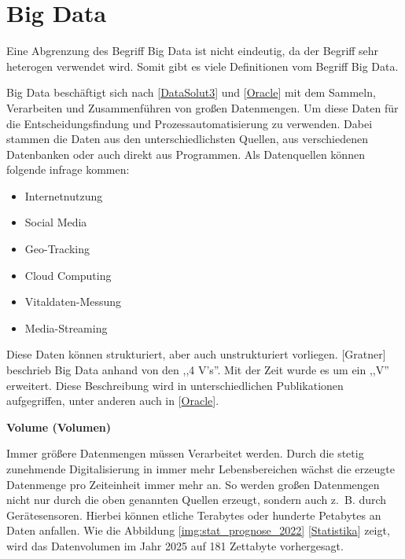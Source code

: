 \section{Big Data}
Eine Abgrenzung des Begriff Big Data ist nicht eindeutig, da der Begriff sehr heterogen verwendet wird. Somit gibt es viele Definitionen vom Begriff Big Data.\vspace{0.2cm}

Big Data beschäftigt sich nach [\href{https://datasolut.com/was-ist-big-data}{DataSolut3}] und [\href{https://www.oracle.com/de/big-data/what-is-big-data}{Oracle}] mit dem Sammeln, Verarbeiten und Zusammenführen von großen Datenmengen. Um diese Daten für die Entscheidungsfindung und Prozessautomatisierung zu verwenden. Dabei stammen die Daten aus den unterschiedlichsten Quellen, aus verschiedenen Datenbanken oder auch direkt aus Programmen. Als Datenquellen können folgende infrage kommen:

\begin{itemize}
	\item Internetnutzung
	\item Social Media
	\item Geo-Tracking
	\item Cloud Computing
	\item Vitaldaten-Messung
	\item Media-Streaming
\end{itemize}

Diese Daten können strukturiert, aber auch unstrukturiert vorliegen. [Gratner] beschrieb Big Data anhand von den ,,4 V's''. Mit der Zeit wurde es um ein ,,V'' erweitert. Diese Beschreibung wird in unterschiedlichen Publikationen aufgegriffen, unter anderen auch in [\href{https://www.oracle.com/de/big-data/what-is-big-data}{Oracle}].\vspace{0.5cm}

\textbf{Volume (Volumen)}\vspace{0.2cm}

Immer größere Datenmengen müssen Verarbeitet werden. Durch die stetig zunehmende Digitalisierung in immer mehr Lebensbereichen wächst die erzeugte Datenmenge pro Zeiteinheit immer mehr an. So werden großen Datenmengen nicht nur durch die oben genannten Quellen erzeugt, sondern auch z. B. durch Gerätesensoren. Hierbei können etliche Terabytes oder hunderte Petabytes an Daten anfallen. Wie die Abbildung \ref{img:stat_prognose_2022} [\href{https://de.statista.com/statistik/daten/studie/267974/umfrage/prognose-zum-weltweit-generierten-datenvolumen}{Statistika}] zeigt, wird das Datenvolumen im Jahr 2025 auf 181 Zettabyte vorhergesagt.\vspace{0.2cm}

